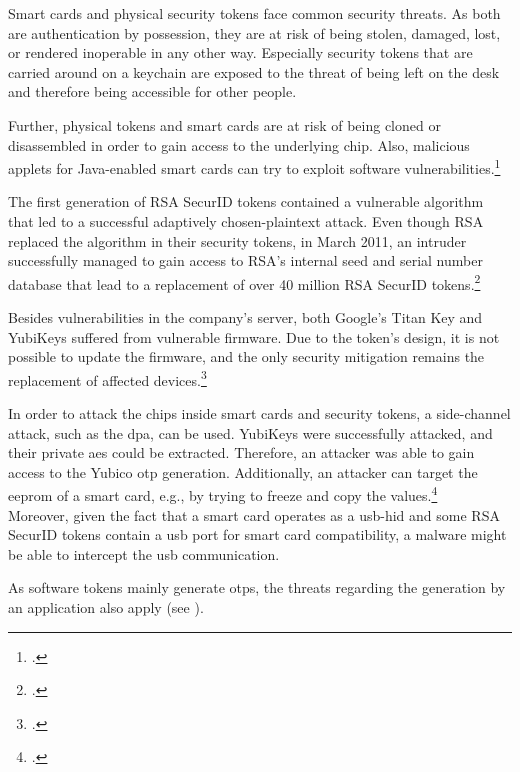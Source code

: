 Smart cards and physical security tokens face common security threats. As both are authentication by possession, they are at risk of being stolen, damaged, lost, or rendered inoperable in any other way. Especially security tokens that are carried around on a keychain are exposed to the threat of being left on the desk and therefore being accessible for other people.

Further, physical tokens and smart cards are at risk of being cloned or disassembled in order to gain access to the underlying chip. Also, malicious applets for Java-enabled smart cards can try to exploit software vulnerabilities.\footcites[See][14--16]{witteman2002advances}

The first generation of RSA SecurID tokens contained a vulnerable algorithm that led to a successful adaptively chosen-plaintext attack. Even though RSA replaced the algorithm in their security tokens, in March 2011, an intruder successfully managed to gain access to RSA's internal seed and serial number database that lead to a replacement of over 40 million RSA SecurID tokens.\footcites[See][480]{eckert-it-sec-9}[See][369]{BIRYUKOV2005364}[See][8]{1324198}

Besides vulnerabilities in the company's server, both Google's Titan Key and YubiKeys suffered from vulnerable firmware. Due to the token's design, it is not possible to update the firmware, and the only security mitigation remains the replacement of affected devices.\footcites[See][]{yubikey-heise}[See][]{titan-key}

In order to attack the chips inside smart cards and security tokens, a side-channel attack, such as the \gls{dpa}, can be used. YubiKeys were successfully attacked, and their private \gls{aes} could be extracted. Therefore, an attacker was able to gain access to the Yubico \gls{otp} generation. Additionally, an attacker can target the \gls{eeprom} of a smart card, e.g., by trying to freeze and copy the values.\footcites[See][210, 212, 219]{10.1007/978-3-642-41284-4_11}[See][502--503, 509]{anderson2008security}\\
Moreover, given the fact that a smart card operates as a \gls{usb}-\gls{hid} and some RSA SecurID tokens contain a \gls{usb} port for smart card compatibility, a malware might be able to intercept the \gls{usb} communication.

As software tokens mainly generate \glspl{otp}, the threats regarding the generation by an application also apply (see ).
 